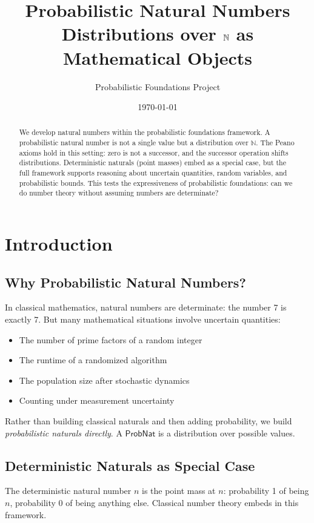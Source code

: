 \documentclass[11pt,a4paper]{article}
\title{Probabilistic Natural Numbers\\[0.5em]
\large Distributions over $\Nat$ as Mathematical Objects}
\author{Probabilistic Foundations Project}
\date{\today}
\newcommand{\ProbNat}{\mathsf{ProbNat}}
\newcommand{\Nat}{\mathbb{N}}
\begin{document}
\maketitle

\begin{abstract}
We develop natural numbers within the probabilistic foundations framework. A probabilistic natural number is not a single value but a distribution over $\Nat$. The Peano axioms hold in this setting: zero is not a successor, and the successor operation shifts distributions. Deterministic naturals (point masses) embed as a special case, but the full framework supports reasoning about uncertain quantities, random variables, and probabilistic bounds. This tests the expressiveness of probabilistic foundations: can we do number theory without assuming numbers are determinate?
\end{abstract}

\section{Introduction}

\subsection{Why Probabilistic Natural Numbers?}

In classical mathematics, natural numbers are determinate: the number 7 is exactly 7. But many mathematical situations involve uncertain quantities:

\begin{itemize}
    \item The number of prime factors of a random integer
    \item The runtime of a randomized algorithm
    \item The population size after stochastic dynamics
    \item Counting under measurement uncertainty
\end{itemize}

Rather than building classical naturals and then adding probability, we build \emph{probabilistic naturals directly}. A $\ProbNat$ is a distribution over possible values.

\subsection{Deterministic Naturals as Special Case}

The deterministic natural number $n$ is the point mass at $n$: probability 1 of being $n$, probability 0 of being anything else. Classical number theory embeds in this framework.
\end{document}
